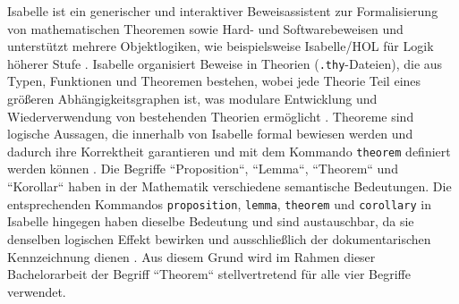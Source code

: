 \documentclass[12pt,letterpaper]{article} %
\begin{document}
Isabelle ist ein generischer und interaktiver Beweisassistent zur Formalisierung von mathematischen Theoremen sowie Hard- und Softwarebeweisen \citep[S. 1]{blanchette_isabelle_nodate} \citep[S. 3]{nipkow_isabellehol_2002} und unterstützt mehrere Objektlogiken, wie beispielsweise Isabelle/HOL für Logik höherer Stufe \citep[S. 1]{blanchette_isabelle_nodate} \citep[S. 2]{blanchette_mining_2015}.
Isabelle organisiert Beweise in Theorien (\texttt{.thy}-Dateien), die aus Typen, Funktionen und Theoremen bestehen, wobei jede Theorie Teil eines größeren Abhängigkeitsgraphen ist, was modulare Entwicklung und Wiederverwendung von bestehenden Theorien ermöglicht \citep[S. 4]{nipkow_isabellehol_2002}.
Theoreme sind logische Aussagen, die innerhalb von Isabelle formal bewiesen werden und dadurch ihre Korrektheit garantieren und mit dem Kommando \texttt{theorem} definiert werden können \citep[S. 7]{nipkow_isabellehol_2002}.
Die Begriffe ``Proposition``, ``Lemma``, ``Theorem`` und ``Korollar`` haben in der Mathematik verschiedene semantische Bedeutungen.
Die entsprechenden Kommandos \texttt{proposition}, \texttt{lemma}, \texttt{theorem} und \texttt{corollary} in Isabelle hingegen haben dieselbe Bedeutung und sind austauschbar, da sie denselben logischen Effekt bewirken und ausschließlich der dokumentarischen Kennzeichnung dienen \citep[S. 13]{nipkow_isabellehol_2002} \citep[S. 63]{lund_teaching_2024}.
Aus diesem Grund wird im Rahmen dieser Bachelorarbeit der Begriff ``Theorem`` stellvertretend für alle vier Begriffe verwendet.
\end{document}
